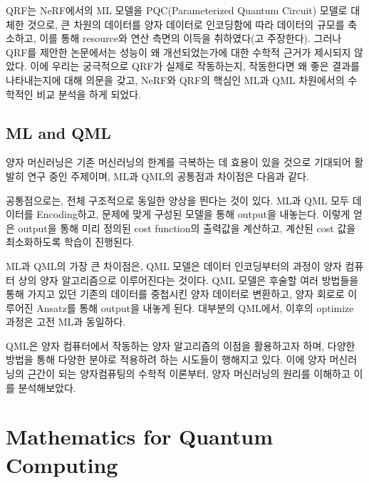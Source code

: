 QRF는 NeRF에서의 ML 모델을 PQC(Parameterized Quantum Circuit) 모델로 대체한 것으로, 큰 차원의 데이터를 양자 데이터로 인코딩함에 따라 데이터의 규모를 축소하고, 이를 통해 resource와 연산 측면의 이득을 취하였다(고 주장한다). 그러나 QRF를 제안한 논문에서는 성능이 왜 개선되었는가에 대한 수학적 근거가 제시되지 않았다. 이에 우리는 궁극적으로 QRF가 실제로 작동하는지, 작동한다면 왜 좋은 결과를 나타내는지에 대해 의문을 갖고, NeRF와 QRF의 핵심인 ML과 QML 차원에서의 수학적인 비교 분석을 하게 되었다.


\subsection{ML and QML}\label{ss:ml and qml}

양자 머신러닝은 기존 머신러닝의 한계를 극복하는 데 효용이 있을 것으로 기대되어 활발히 연구 중인 주제이며, ML과 QML의 공통점과 차이점은 다음과 같다.

공통점으로는, 전체 구조적으로 동일한 양상을 띈다는 것이 있다. ML과 QML 모두 데이터를 Encoding하고, 문제에 맞게 구성된 모델을 통해 output을 내놓는다. 이렇게 얻은 output을 통해 미리 정의된 cost function의 출력값을 계산하고, 계산된 cost 값을 최소화하도록 학습이 진행된다.

ML과 QML의 가장 큰 차이점은, QML 모델은 데이터 인코딩부터의 과정이 양자 컴퓨터 상의 양자 알고리즘으로 이루어진다는 것이다. QML 모델은 후술할 여러 방법들을 통해 가지고 있던 기존의 데이터를 중첩시킨 양자 데이터로 변환하고, 양자 회로로 이루어진 Ansatz를 통해 output을 내놓게 된다. 대부분의 QML에서, 이후의 optimize 과정은 고전 ML과 동일하다.

QML은 양자 컴퓨터에서 작동하는 양자 알고리즘의 이점을 활용하고자 하며, 다양한 방법을 통해 다양한 분야로 적용하려 하는 시도들이 행해지고 있다. 이에 양자 머신러닝의 근간이 되는 양자컴퓨팅의 수학적 이론부터, 양자 머신러닝의 원리를 이해하고 이를 분석해보았다.

\section{Mathematics for Quantum Computing}\label{ss:math for qc}


